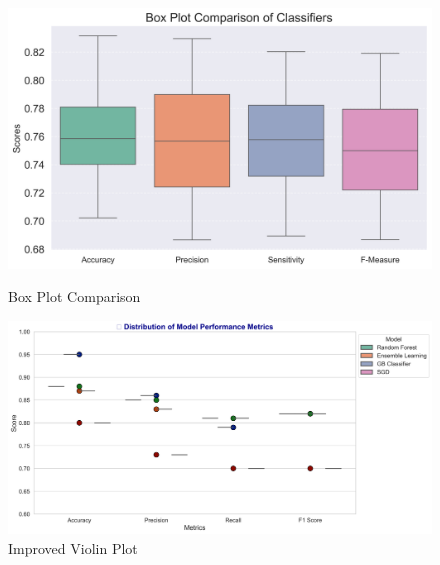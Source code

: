 \begin{figure}[H]
	\begin{minipage}[b]{0.45\textwidth}
		\centering
		\includegraphics[width=\textwidth]{img/paper_1/box_plot_comparison.png}
		\caption{Box Plot Comparison}
	\end{minipage}
	\hfill
	\begin{minipage}[b]{0.45\textwidth}
		\centering
		\includegraphics[width=\textwidth]{img/paper_1/violin_plot_improved.png}
		\caption{Improved Violin Plot}
	\end{minipage}
\end{figure}
